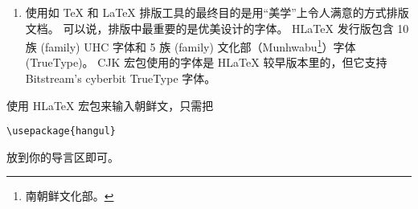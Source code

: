 \begin{enumerate}
\item 使用如 \TeX{} 和 \LaTeX{} 排版工具的最终目的是用“美学”上令人满意的方式排版文档。
可以说，排版中最重要的是优美设计的字体。
H\LaTeX{} 发行版包含 10 族 (family)  UHC \PSi{} 字体和 5 族 (family) 文化部（Munhwabu\footnote{南朝鲜文化部。}）字体 (TrueType)。
CJK 宏包使用的字体是 H\LaTeX{} 较早版本里的，但它支持 Bitstream's
cyberbit TrueType 字体。
\end{enumerate}

使用 H\LaTeX{} 宏包来输入朝鲜文，只需把
\begin{lscommand}
\verb+\usepackage{hangul}+
\end{lscommand}
\noindent 放到你的导言区即可。

